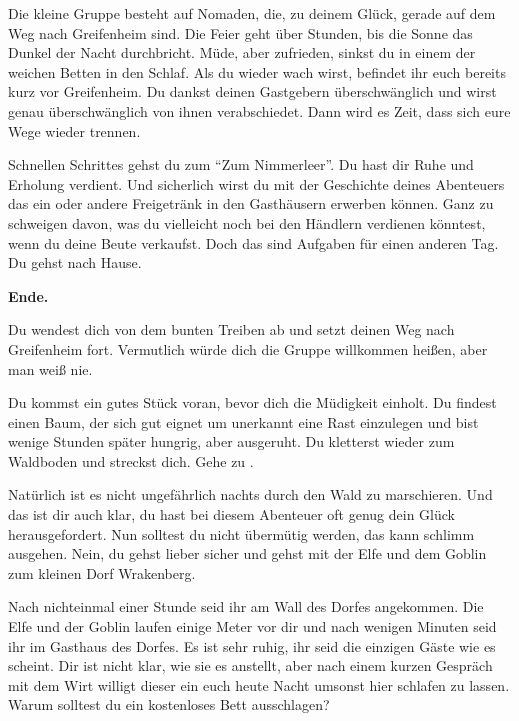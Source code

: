 Die kleine Gruppe besteht auf Nomaden, die, zu deinem Glück, gerade auf dem Weg nach Greifenheim sind. Die Feier geht über Stunden, bis die Sonne das Dunkel der Nacht durchbricht. Müde, aber zufrieden, sinkst du in einem der weichen Betten in den Schlaf. Als du wieder wach wirst, befindet ihr euch bereits kurz vor Greifenheim. Du dankst deinen Gastgebern überschwänglich und wirst genau überschwänglich von ihnen verabschiedet. Dann wird es Zeit, dass sich eure Wege wieder trennen.

Schnellen Schrittes gehst du zum ``Zum Nimmerleer''. Du hast dir Ruhe und Erholung verdient. Und sicherlich wirst du mit der Geschichte deines Abenteuers das ein oder andere Freigetränk in den Gasthäusern erwerben können. Ganz zu schweigen davon, was du vielleicht noch bei den Händlern verdienen könntest, wenn du deine Beute verkaufst. Doch das sind Aufgaben für einen anderen Tag. Du gehst nach Hause.

\textbf{Ende.}


Du wendest dich von dem bunten Treiben ab und setzt deinen Weg nach Greifenheim fort. Vermutlich würde dich die Gruppe willkommen heißen, aber man weiß nie.

Du kommst ein gutes Stück voran, bevor dich die Müdigkeit einholt. Du findest einen Baum, der sich gut eignet um unerkannt eine Rast einzulegen und bist wenige Stunden später hungrig, aber ausgeruht.
Du kletterst wieder zum Waldboden und streckst dich. Gehe zu .


Natürlich ist es nicht ungefährlich nachts durch den Wald zu marschieren.
Und das ist dir auch klar, du hast bei diesem Abenteuer oft genug dein Glück herausgefordert.
Nun solltest du nicht übermütig werden, das kann schlimm ausgehen.
Nein, du gehst lieber sicher und gehst mit der Elfe und dem Goblin zum kleinen Dorf Wrakenberg.

Nach nichteinmal einer Stunde seid ihr am Wall des Dorfes angekommen. Die Elfe und der Goblin laufen einige Meter vor dir und nach wenigen Minuten seid ihr im Gasthaus des Dorfes. Es ist sehr ruhig, ihr seid die einzigen Gäste wie es scheint.
Dir ist nicht klar, wie sie es anstellt, aber nach einem kurzen Gespräch mit dem Wirt willigt dieser ein euch heute Nacht umsonst hier schlafen zu lassen. Warum solltest du ein kostenloses Bett ausschlagen?

